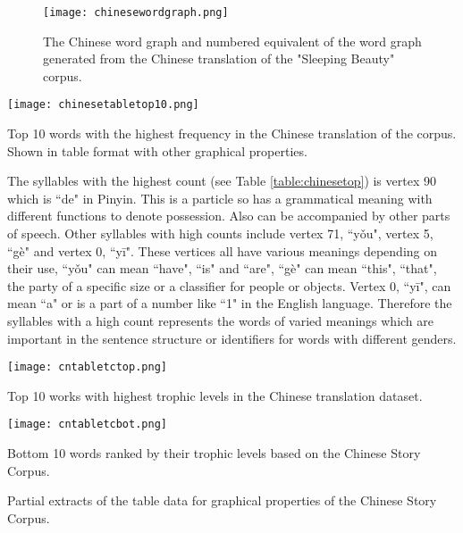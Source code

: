 \begin{figure}[H]
\centering
\texttt{[image: chinesewordgraph.png]}
\caption{The Chinese word graph and numbered equivalent of the word graph generated from the Chinese translation of the "Sleeping Beauty" corpus.}
\label{fig:cngraph}
\end{figure}

\begin{table}[H]
\centering
\texttt{[image: chinesetabletop10.png]}
\caption{Top 10 words with the highest frequency in the Chinese translation of the corpus. Shown in table format with other graphical properties. }
\label{table:chinesetop}
\end{table}

The syllables with the highest count (see Table \ref{table:chinesetop}) is vertex 90 which is ``de" in Pinyin. This is a particle so has a grammatical meaning with different functions to denote possession. Also can be accompanied by other parts of speech. Other syllables with high counts include vertex 71, ``yǒu", vertex 5, ``gè" and vertex 0, ``yī". These vertices all have various meanings depending on their use, ``yǒu" can mean ``have", ``is" and ``are", ``gè" can mean ``this", ``that", the party of a specific size or a classifier for people or objects. Vertex 0, ``yī", can mean ``a" or is a part of a number like ``1" in the English language. Therefore the syllables with a high count represents the words of varied meanings which are important in the sentence structure or identifiers for words with different genders.

\begin{table}[H]
\centering
\begin{subtable}{.45\textwidth}
	\centering
	\texttt{[image: cntabletctop.png]}
	\caption{Top 10 works with highest trophic levels in the Chinese translation dataset.}
	\label{table:chinesetoptc}
\end{subtable}
\hfill
\begin{subtable}{.45\textwidth}
	\centering
	\texttt{[image: cntabletcbot.png]}
	\caption{Bottom 10 words ranked by their trophic levels based on the Chinese Story Corpus.}
	\label{table:chinesebottc}
\end{subtable}
\caption{Partial extracts of the table data for graphical properties of the Chinese Story Corpus.}
\end{table}

